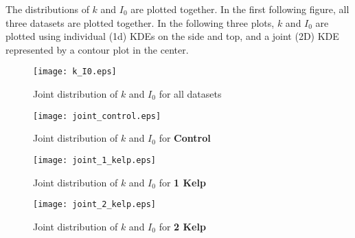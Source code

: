 \documentclass{article}
\begin{document}
The distributions of $k$ and $I_0$ are plotted together. In the first following figure, all three datasets are plotted together. In the following three plots, $k$ and $I_0$ are plotted using individual (1d) KDEs on the side and top, and a joint (2D) KDE represented by a contour plot in the center.

\begin{figure}[H]
	\centering
	\texttt{[image: k\_I0.eps]}
	\caption{Joint distribution of $k$ and $I_0$ for all datasets}
\end{figure}

\begin{figure}[H]
	\centering
	\texttt{[image: joint\_control.eps]}
	\caption{Joint distribution of $k$ and $I_0$ for \textbf{Control}}
	\label{joint_control}
\end{figure}

\begin{figure}[H]
	\centering
	\texttt{[image: joint\_1\_kelp.eps]}
	\caption{Joint distribution of $k$ and $I_0$ for \textbf{1 Kelp}}
	\label{joint_1_kelp}
\end{figure}

\begin{figure}[H]
	\centering
	\texttt{[image: joint\_2\_kelp.eps]}
	\caption{Joint distribution of $k$ and $I_0$ for \textbf{2 Kelp}}
	\label{joint_2_kelp}
\end{figure}
\end{document}
